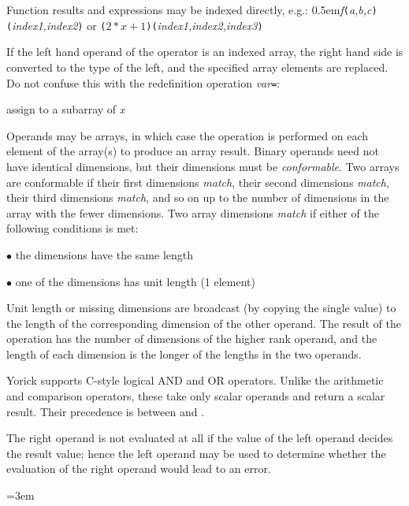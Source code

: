 Function results and expressions may be indexed directly, e.g.:
\hfil\break
\hglue0.5em{\it f\/}{\tt (}{\it a,b,c\/}{\tt )(}{\it index1,index2\/}{\tt )}
or
{\tt (}$2*x+1${\tt )(}{\it index1,index2,index3\/}{\tt )}

If the left hand operand of the \kbd{=} operator is an indexed array, the
right hand side is converted to the type of the left, and the specified
array elements are replaced.  Do not confuse this with the redefinition
operation {\it var}{\tt =}:

       {assign to a subarray of {\it x}}


Operands may be arrays, in which case the operation is performed on
each element of the array(s) to produce an array result.  Binary
operands need not have identical dimensions, but their dimensions must
be {\it conformable}.  Two arrays are conformable if their first
dimensions {\it match}, their second dimensions {\it match}, their
third dimensions {\it match}, and so on up to the number of dimensions in
the array with the fewer dimensions.  Two array dimensions {\it match\/}
if either of the following conditions is met:

$\bullet$ the dimensions have the same length

$\bullet$ one of the dimensions has unit length (1 element)

Unit length or missing dimensions are broadcast (by copying the single
value) to the length of the corresponding dimension of the other
operand.  The result of the operation has the number of dimensions of
the higher rank operand, and the length of each dimension is the
longer of the lengths in the two operands.


Yorick supports C-style logical AND and OR operators.  Unlike
the arithmetic and comparison operators, these take only scalar
operands and return a scalar  result.  Their precedence
is between \kbd{|} and \kbd{=}.

The right operand is not evaluated at all if the value of the
left operand decides the result value; hence the left operand
may be used to determine whether the evaluation of the right
operand would lead to an error.

\keyindent=3em
\endindentedkeys

